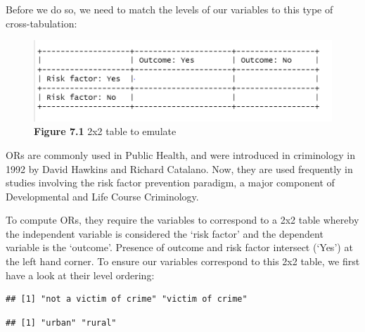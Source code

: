 \documentclass[
]{book}
\newenvironment{Shaded}{\begin{snugshade}}{\end{snugshade}}
\newcommand{\FunctionTok}[1]{\textcolor[rgb]{0.00,0.00,0.00}{#1}}
\newcommand{\NormalTok}[1]{#1}
\newcommand{\SpecialCharTok}[1]{\textcolor[rgb]{0.00,0.00,0.00}{#1}}
\begin{document}
Before we do so, we need to match the levels of our variables to this type of cross-tabulation:

\begin{figure}
\centering
\includegraphics{Images/OR.png}
\caption{\textbf{Figure 7.1} 2x2 table to emulate}
\end{figure}

ORs are commonly used in Public Health, and were introduced in criminology in 1992 by David Hawkins and Richard Catalano. Now, they are used frequently in studies involving the risk factor prevention paradigm, a major component of Developmental and Life Course Criminology.

To compute ORs, they require the variables to correspond to a 2x2 table whereby the independent variable is considered the `risk factor' and the dependent variable is the `outcome'. Presence of outcome and risk factor intersect (`Yes') at the left hand corner. To ensure our variables correspond to this 2x2 table, we first have a look at their level ordering:

\begin{Shaded}
\end{Shaded}

\begin{verbatim}
## [1] "not a victim of crime" "victim of crime"
\end{verbatim}

\begin{Shaded}
\end{Shaded}

\begin{verbatim}
## [1] "urban" "rural"
\end{verbatim}
\end{document}
